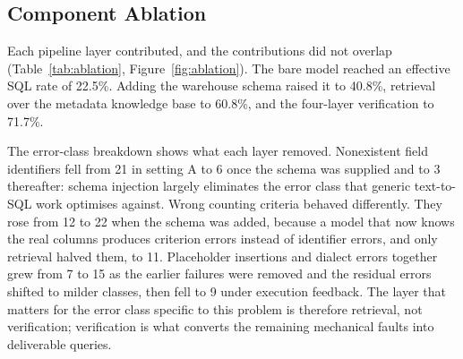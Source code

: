 \documentclass[applsci,article,submit,pdftex,oneauthor]{Definitions/mdpi}
\begin{document}
\subsection{Component Ablation}
Each pipeline layer contributed, and the contributions did not overlap
(Table~\ref{tab:ablation}, Figure~\ref{fig:ablation}). The bare model reached an effective SQL rate of
22.5\%. Adding the warehouse schema raised it to 40.8\%, retrieval over the
metadata knowledge base to 60.8\%, and the four-layer verification to 71.7\%.

The error-class breakdown shows what each layer removed. Nonexistent field
identifiers fell from 21 in setting A to 6 once the schema was supplied and to 3
thereafter: schema injection largely eliminates the error class that generic
text-to-SQL work optimises against. Wrong counting criteria behaved differently.
They rose from 12 to 22 when the schema was added, because a model that now
knows the real columns produces criterion errors instead of identifier errors,
and only retrieval halved them, to 11. Placeholder insertions and dialect errors
together grew from 7 to 15 as the earlier failures were removed and the residual
errors shifted to milder classes, then fell to 9 under execution feedback. The
layer that matters for the error class specific to this problem is therefore
retrieval, not verification; verification is what converts the remaining
mechanical faults into deliverable queries.
\end{document}
